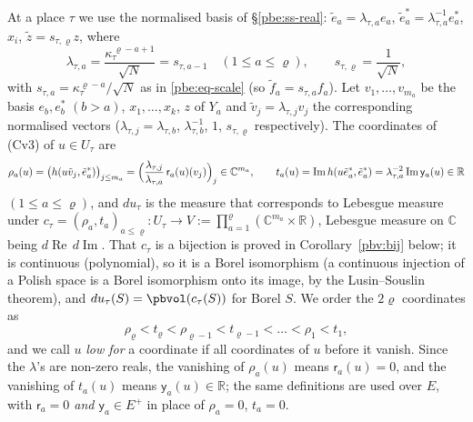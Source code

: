 \documentclass[10pt]{amsart}
\theoremstyle{definition}
\theoremstyle{remark}
\newcommand{\C}{\mathbb C}
\newcommand{\R}{\mathbb R}
\newcommand{\Rel}{\operatorname{Re}}
\newcommand{\Iml}{\operatorname{Im}}
\begin{document}
At a place $\tau$ we use the normalised basis of \S\ref{pbe:ss-real}: $\tilde e_a=\lambda_{\tau,a}e_a$,
$\tilde e_a^*=\lambda_{\tau,a}^{-1}e_a^*$, $x_i$, $\tilde z=s_{\tau,\varrho}z$, where
\begin{equation}\label{pbv:eq-lambda}
\lambda_{\tau,a}=\frac{\kappa_\tau^{\,\varrho-a+1}}{\sqrt N}=s_{\tau,a-1}\quad(1\le a\le\varrho),\qquad
s_{\tau,\varrho}=\frac1{\sqrt N},
\end{equation}
with $s_{\tau,a}=\kappa_\tau^{\varrho-a}/\sqrt N$ as in \eqref{pbe:eq-scale} (so $\tilde f_a=s_{\tau,a}f_a$).
Let $v_1,\dots,v_{m_a}$ be the basis $e_b,e_b^*$ $(b>a)$, $x_1,\dots,x_k$, $z$ of $Y_a$ and $\tilde
v_j=\lambda_{\tau,j}v_j$ the corresponding normalised vectors ($\lambda_{\tau,j}=\lambda_{\tau,b}$,
$\lambda_{\tau,b}^{-1}$, $1$, $s_{\tau,\varrho}$ respectively). The coordinates of (Cv3) of $u\in U_\tau$
are
\begin{equation}\label{pbv:eq-coord}
\rho_a(u)=\bigl(h(u\tilde v_j,\tilde e_a^*)\bigr)_{j\le m_a}=\Bigl(\frac{\lambda_{\tau,j}}{\lambda_{\tau,a}}
\,\mathsf r_a(u)(v_j)\Bigr)_j\in\C^{m_a},\qquad t_a(u)=\Iml h(u\tilde e_a^*,\tilde e_a^*)=
\lambda_{\tau,a}^{-2}\Iml\mathsf y_a(u)\in\R
\end{equation}
$(1\le a\le\varrho)$, and $du_\tau$ is the measure that corresponds to Lebesgue measure under
$c_\tau=(\rho_a,t_a)_{a\le\varrho}\colon U_\tau\to V:=\prod_{a=1}^{\varrho}(\C^{m_a}\times\R)$, Lebesgue
measure on $\C$ being $d\Rel\,d\Iml$. That $c_\tau$ is a bijection is proved in
Corollary~\ref{pbv:bij} below; it is continuous (polynomial), so it is a Borel isomorphism (a
continuous injection of a Polish space is a Borel isomorphism onto its image, by the Lusin--Souslin
theorem), and $du_\tau(S)=\pbvol(c_\tau(S))$ for Borel $S$. We order the $2\varrho$ coordinates as
\begin{equation}\label{pbv:eq-order}
\rho_\varrho<t_\varrho<\rho_{\varrho-1}<t_{\varrho-1}<\dots<\rho_1<t_1 ,
\end{equation}
and we call $u$ \emph{low for} a coordinate if all coordinates of $u$ before it vanish. Since the
$\lambda$'s are non-zero reals, the vanishing of $\rho_a(u)$ means $\mathsf r_a(u)=0$, and the vanishing of
$t_a(u)$ means $\mathsf y_a(u)\in\R$; the same definitions are used over $E$, with
\emph{$\mathsf r_a=0$ and $\mathsf y_a\in E^+$} in place of $\rho_a=0$, $t_a=0$.
\end{document}
